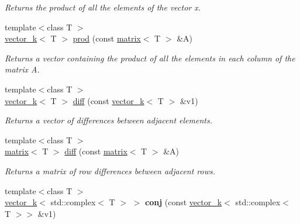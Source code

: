 \begin{DoxyCompactItemize}
\begin{DoxyCompactList}\small\item\em Returns the product of all the elements of the vector x. \end{DoxyCompactList}\item 
\hypertarget{namespacekeycpp_af5471fc9074471701bde9e68eb7971b4}{{\footnotesize template$<$class T $>$ }\\\hyperlink{classkeycpp_1_1vector__k}{vector\-\_\-k}$<$ T $>$ \hyperlink{namespacekeycpp_af5471fc9074471701bde9e68eb7971b4}{prod} (const \hyperlink{classkeycpp_1_1matrix}{matrix}$<$ T $>$ \&A)}\label{namespacekeycpp_af5471fc9074471701bde9e68eb7971b4}

\begin{DoxyCompactList}\small\item\em Returns a vector containing the product of all the elements in each column of the matrix A. \end{DoxyCompactList}\item 
\hypertarget{namespacekeycpp_a52c37ec9c41349fd6bd862b8ebdd01bb}{{\footnotesize template$<$class T $>$ }\\\hyperlink{classkeycpp_1_1vector__k}{vector\-\_\-k}$<$ T $>$ \hyperlink{namespacekeycpp_a52c37ec9c41349fd6bd862b8ebdd01bb}{diff} (const \hyperlink{classkeycpp_1_1vector__k}{vector\-\_\-k}$<$ T $>$ \&v1)}\label{namespacekeycpp_a52c37ec9c41349fd6bd862b8ebdd01bb}

\begin{DoxyCompactList}\small\item\em Returns a vector of differences between adjacent elements. \end{DoxyCompactList}\item 
{\footnotesize template$<$class T $>$ }\\\hyperlink{classkeycpp_1_1matrix}{matrix}$<$ T $>$ \hyperlink{namespacekeycpp_abb4e57814fd30b7b8d4845bbc16c73e9}{diff} (const \hyperlink{classkeycpp_1_1matrix}{matrix}$<$ T $>$ \&A)
\begin{DoxyCompactList}\small\item\em Returns a matrix of row differences between adjacent rows. \end{DoxyCompactList}\item 
\hypertarget{namespacekeycpp_a436cfe206bb34dfe613ac495e792b155}{{\footnotesize template$<$class T $>$ }\\\hyperlink{classkeycpp_1_1vector__k}{vector\-\_\-k}$<$ std\-::complex$<$ T $>$ $>$ {\bfseries conj} (const \hyperlink{classkeycpp_1_1vector__k}{vector\-\_\-k}$<$ std\-::complex$<$ T $>$$>$ \&v1)}\label{namespacekeycpp_a436cfe206bb34dfe613ac495e792b155}


\end{DoxyCompactItemize}
